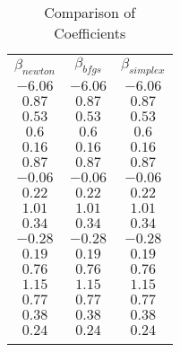 \begin{table}[!b]
    \centering \small
    \caption{Comparison of Coefficients}
    \begin{tabular}{ccc}
    \par \toprule 
    $\beta_{newton}$ & $\beta_{bfgs}$ & $\beta_{simplex}$\\
    \par \midrule
    $-6.06$ & $-6.06$ & $-6.06$\\
    $0.87$ & $0.87$ & $0.87$\\
    $0.53$ & $0.53$ & $0.53$\\
    $0.6$ & $0.6$ & $0.6$\\
    $0.16$ & $0.16$ & $0.16$\\
    $0.87$ & $0.87$ & $0.87$\\
    $-0.06$ & $-0.06$ & $-0.06$\\
    $0.22$ & $0.22$ & $0.22$\\
    $1.01$ & $1.01$ & $1.01$\\
    $0.34$ & $0.34$ & $0.34$\\
    $-0.28$ & $-0.28$ & $-0.28$\\
    $0.19$ & $0.19$ & $0.19$\\
    $0.76$ & $0.76$ & $0.76$\\
    $1.15$ & $1.15$ & $1.15$\\
    $0.77$ & $0.77$ & $0.77$\\
    $0.38$ & $0.38$ & $0.38$\\
    $0.24$ & $0.24$ & $0.24$\\
    \par \toprule
    \end{tabular}
\label{tab1}
\end{table}
